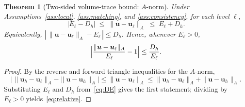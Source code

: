 \documentclass[11pt,a4paper]{article}
\newtheorem{theorem}{Theorem}[section]
\theoremstyle{definition}
\newcommand{\vel}{\bm{u}}
\begin{document}
\begin{theorem}[Two-sided volume-trace bound: $A$-norm]\label{thm:sep-A}
  Under Assumptions~\ref{ass:local}, \ref{ass:matching}, and
  \ref{ass:consistency},
  for each level $\ell$,
  \begin{equation}\label{eq:sep-A}
    |E_\ell - D_h|
    \;\le\; \|\vel - \vel_\ell\|_A
    \;\le\; E_\ell + D_h.
  \end{equation}
  Equivalently,
  $|\,\|\vel-\vel_\ell\|_A - E_\ell\,| \le D_h$.
  Hence, whenever $E_\ell>0$,
  \begin{equation}\label{eq:relative}
    \Bigl|
      \frac{\|\vel-\vel_\ell\|_A}{E_\ell} - 1
    \Bigr|
    \le \frac{D_h}{E_\ell}.
  \end{equation}
\end{theorem}

\begin{proof}
  By the reverse and forward triangle inequalities for the $A$-norm,
  \[
    \bigl|\|\vel_h - \vel_\ell\|_A - \|\vel - \vel_h\|_A\bigr|
    \le \|\vel - \vel_\ell\|_A
    \le \|\vel_h - \vel_\ell\|_A + \|\vel - \vel_h\|_A.
  \]
  Substituting $E_\ell$ and $D_h$ from~\eqref{eq:DE} gives the first
  statement; dividing by $E_\ell>0$ yields~\eqref{eq:relative}.
\end{proof}
\end{document}
